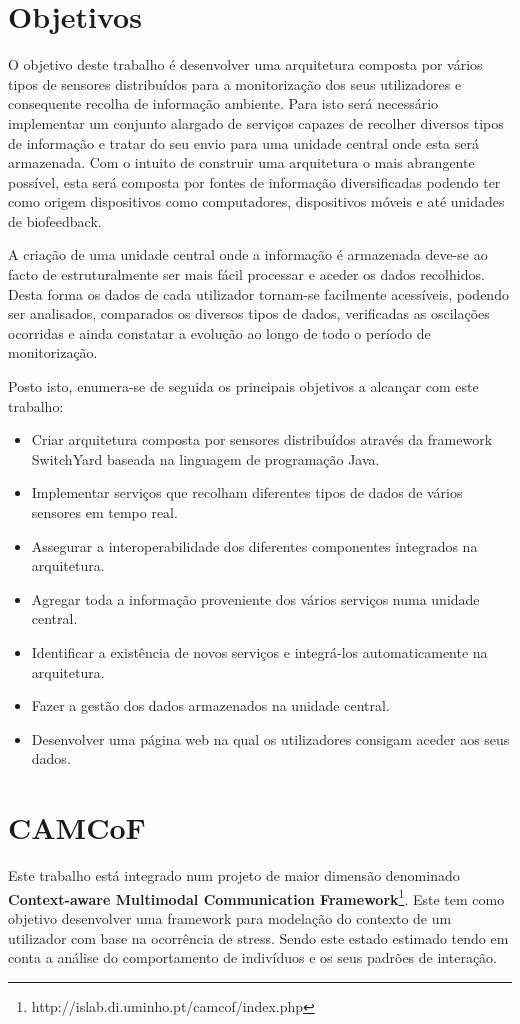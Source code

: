 \section{Objetivos}

O objetivo deste trabalho é desenvolver uma arquitetura composta por vários tipos de sensores distribuídos para a monitorização dos seus utilizadores e consequente recolha de informação ambiente. Para isto será necessário implementar um conjunto alargado de serviços capazes de recolher diversos tipos de informação e tratar do seu envio para uma unidade central onde esta será armazenada. Com o intuito de construir uma arquitetura o mais abrangente possível, esta será composta por fontes de informação diversificadas podendo ter como origem dispositivos como computadores, dispositivos móveis e até unidades de biofeedback.

A criação de uma unidade central onde a informação é armazenada deve-se ao facto de estruturalmente ser mais fácil processar e aceder os dados recolhidos. Desta forma os dados de cada utilizador tornam-se facilmente acessíveis, podendo ser analisados, comparados os diversos tipos de dados, verificadas as oscilações ocorridas e ainda constatar a evolução ao longo de todo o período de monitorização.

Posto isto, enumera-se de seguida os principais objetivos a alcançar com este trabalho:
\begin{itemize}
  \item Criar arquitetura composta por sensores distribuídos através da framework SwitchYard baseada na linguagem de programação Java.
  \item Implementar serviços que recolham diferentes tipos de dados de vários sensores em tempo real.
  \item Assegurar a interoperabilidade dos diferentes componentes integrados na arquitetura.
  \item Agregar toda a informação proveniente dos vários serviços numa unidade central.
  \item Identificar a existência de novos serviços e integrá-los automaticamente na arquitetura.
  \item Fazer a gestão dos dados armazenados na unidade central.
  \item Desenvolver uma página web na qual os utilizadores consigam aceder aos seus dados.
  \end{itemize}


\section{CAMCoF}
Este trabalho está integrado num projeto de maior dimensão denominado \textbf{Context-aware Multimodal Communication Framework}\footnote{http://islab.di.uminho.pt/camcof/index.php}. Este tem como objetivo desenvolver uma framework para modelação do contexto de um utilizador com base na ocorrência de stress. Sendo este estado estimado tendo em conta a análise do comportamento de indivíduos e os seus padrões de interação.

